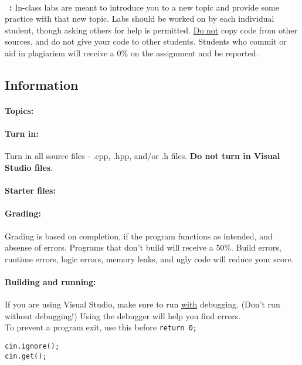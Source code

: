 \footnotesize
~\\ 
\textbf{\laType\ \laAssignment: \laTitle \tab } 
In-class labs are meant to introduce you to a new topic and provide
some practice with that new topic. Labs should be worked on by each
individual student, though asking others for help is permitted.
\underline{Do not} copy code from other sources, and do not give your
code to other students. Students who commit or aid in plagiarism will
receive a 0\% on the assignment and be reported.

\hrulefill
\normalsize 

    \subsection*{Information}
    
        \paragraph{Topics:} \laTopics

        \paragraph{Turn in:}
            Turn in all source files - .cpp, .hpp, and/or .h files.
            \textbf{Do not turn in Visual Studio files}.

        \paragraph{Starter files:} \laStarterFiles

        \paragraph{Grading:}
            Grading is based on completion, if the program functions as intended,
            and absense of errors. Programs that don't build will receive a 50\%.{}
            Build errors, runtime errors, logic errors, memory leaks, and ugly code will reduce your score.

        \paragraph{Building and running:} If you are using Visual Studio,
            make sure to run \underline{with} debugging. (Don't run without debugging!)
            Using the debugger will help you find errors. \\
            To prevent a program exit, use this before \texttt{return 0;}
\begin{verbatim}
cin.ignore();
cin.get();
\end{verbatim}

        \tableofcontents

    \newpage
